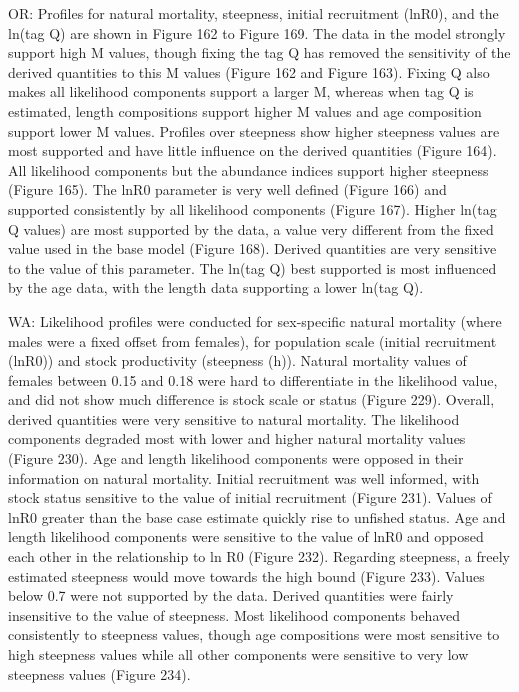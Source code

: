 \documentclass[11pt,
  english,
  letterpaper,
]{article}
\begin{document}
OR: Profiles for natural mortality, steepness, initial recruitment (lnR0), and the ln(tag Q) are shown in Figure 162 to Figure 169. The data in the model strongly support high M values, though fixing the tag Q has removed the sensitivity of the derived quantities to this M values (Figure 162 and Figure 163). Fixing Q also makes all likelihood components support a larger M, whereas when tag Q is estimated, length compositions support higher M values and age composition support lower M values. Profiles over steepness show higher steepness values are most supported and have little influence on the derived quantities (Figure 164). All likelihood components but the abundance indices support higher steepness (Figure 165). The lnR0 parameter is very well defined (Figure 166) and supported consistently by all likelihood components (Figure 167). Higher ln(tag Q values) are most supported by the data, a value very different from the fixed value used in the base model (Figure 168). Derived quantities are very sensitive to the value of this parameter. The ln(tag Q) best supported is most influenced by the age data, with the length data supporting a lower ln(tag Q).

WA: Likelihood profiles were conducted for sex-specific natural mortality (where males were a fixed offset from females), for population scale (initial recruitment (lnR0)) and stock productivity (steepness (h)). Natural mortality values of females between 0.15 and 0.18 were hard to differentiate in the likelihood value, and did not show much difference is stock scale or status (Figure 229). Overall, derived quantities were very sensitive to natural mortality. The likelihood components degraded most with lower and higher natural mortality values (Figure 230). Age and length likelihood components were opposed in their information on natural mortality. Initial recruitment was well informed, with stock status sensitive to the value of initial recruitment (Figure 231). Values of lnR0 greater than the base case estimate quickly rise to unfished status. Age and length likelihood components were sensitive to the value of lnR0 and opposed each other in the relationship to ln R0 (Figure 232). Regarding steepness, a freely estimated steepness would move towards the high bound (Figure 233). Values below 0.7 were not supported by the data. Derived quantities were fairly insensitive to the value of steepness. Most likelihood components behaved consistently to steepness values, though age compositions were most sensitive to high steepness values while all other components were sensitive to very low steepness values (Figure 234).
\end{document}
